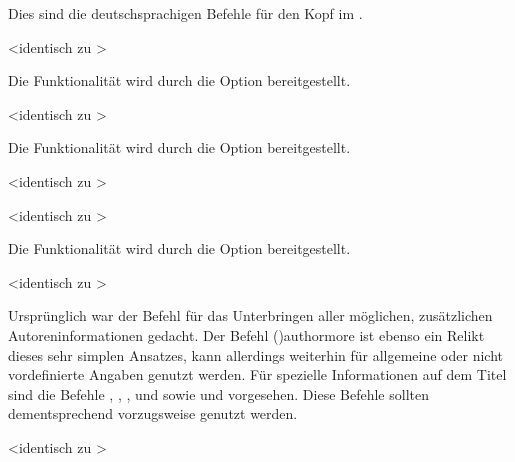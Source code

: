 \begin{DeclareEntity}{}
\begin{Declaration}
\begin{Declaration}
\begin{Declaration}
\begin{Declaration}
Dies sind die deutschsprachigen Befehle für den Kopf im \CD.
\end{Declaration}
\end{Declaration}
\end{Declaration}
\end{Declaration}

\begin{Declaration}
  {}
  <identisch zu >
\printdeclarationlist

Die Funktionalität wird durch die Option  bereitgestellt.
\end{Declaration}

\begin{Declaration}
  {}
  <identisch zu >
\printdeclarationlist

Die Funktionalität wird durch die Option  bereitgestellt.
\end{Declaration}

\begin{Declaration}
  {}
  <identisch zu >
\begin{Declaration}
  {}
  <identisch zu >
\printdeclarationlist

Die Funktionalität wird durch die Option  bereitgestellt.
\end{Declaration}
\end{Declaration}

\begin{Declaration}
  {}
  <identisch zu >
\printdeclarationlist

Ursprünglich war der Befehl für das Unterbringen aller möglichen, zusätzlichen 
Autoreninformationen gedacht. Der Befehl \Macro*(){authormore} 
ist ebenso ein Relikt dieses sehr simplen Ansatzes, kann allerdings weiterhin 
für allgemeine oder nicht vordefinierte Angaben genutzt werden. Für spezielle 
Informationen auf dem Titel sind die Befehle , 
, ,  
und  sowie  und 
 vorgesehen. Diese Befehle sollten dementsprechend 
vorzugsweise genutzt werden.
\end{Declaration}

\begin{Declaration}
  {}
  <identisch zu >
\printdeclarationlist


\end{Declaration}
\end{DeclareEntity}
